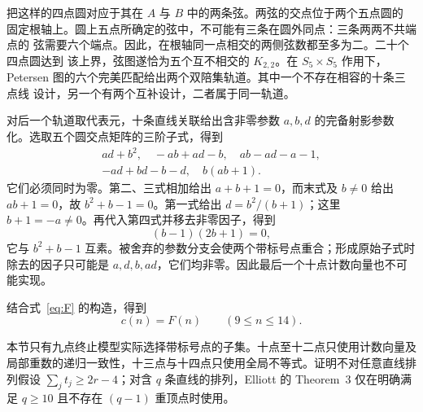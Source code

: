 把这样的四点圆对应于其在 $A$ 与 $B$ 中的两条弦。两弦的交点位于两个五点圆的
固定根轴上。圆上五点所确定的弦中，不可能有三条在圆外同点：三条两两不共端点的
弦需要六个端点。因此，在根轴同一点相交的两侧弦数都至多为二。二十个四点圆达到
该上界，弦图遂恰为五个互不相交的 $K_{2,2}$。在 $S_5\times S_5$ 作用下，
Petersen 图的六个完美匹配给出两个双陪集轨道。其中一个不存在相容的十条三点线
设计，另一个有两个互补设计，二者属于同一轨道。

对后一个轨道取代表元，十条直线关联给出含非零参数 $a,b,d$ 的完备射影参数化。选取五个圆交点矩阵的三阶子式，得到
\begin{gather*}
 ad+b^2,\quad -ab+ad-b,\quad ab-ad-a-1,\\
 -ad+bd-b-d,\quad b(ab+1).
\end{gather*}
它们必须同时为零。第二、三式相加给出 $a+b+1=0$，而末式及 $b\ne0$ 给出
$ab+1=0$，故 $b^2+b-1=0$。第一式给出
$d=b^2/(b+1)$；这里 $b+1=-a\ne0$。再代入第四式并移去非零因子，得到
\[
 (b-1)(2b+1)=0,
\]
它与 $b^2+b-1$ 互素。被舍弃的参数分支会使两个带标号点重合；形成原始子式时除去的因子只可能是
$a,d,b,ad$，它们均非零。因此最后一个十点计数向量也不可能实现。

结合式~\eqref{eq:F} 的构造，得到
\[
 c(n)=F(n)\qquad(9\le n\le14).
\]

\begin{remark}[有限验证的范围]
本节只有九点终止模型实际选择带标号点的子集。十点至十二点只使用计数向量及
局部重数的递归一致性，十三点与十四点只使用全局不等式。证明不对任意直线排列假设
$\sum_jt_j\ge2r-4$；对含 $q$ 条直线的排列，Elliott 的 Theorem~3 仅在明确满足
$q\ge10$ 且不存在 $(q-1)$ 重顶点时使用。
\end{remark}
